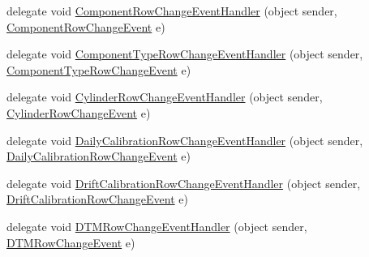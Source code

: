 \begin{DoxyCompactItemize}
\item 
delegate void \hyperlink{class_env_int_1_1_win32_1_1_field_tech_1_1_manager_1_1_data_sets_1_1_guide_ware_mobile_data_set_ab767e59a10801c8c87ea9efc7cbfbd8b}{Component\+Row\+Change\+Event\+Handler} (object sender, \hyperlink{class_env_int_1_1_win32_1_1_field_tech_1_1_manager_1_1_data_sets_1_1_guide_ware_mobile_data_set_1_1_component_row_change_event}{Component\+Row\+Change\+Event} e)
\item 
delegate void \hyperlink{class_env_int_1_1_win32_1_1_field_tech_1_1_manager_1_1_data_sets_1_1_guide_ware_mobile_data_set_abd1972df64c9aa03de1019f79a6c4631}{Component\+Type\+Row\+Change\+Event\+Handler} (object sender, \hyperlink{class_env_int_1_1_win32_1_1_field_tech_1_1_manager_1_1_data_sets_1_1_guide_ware_mobile_data_set_6cb4a1a3a59d09909759d45113e3e872}{Component\+Type\+Row\+Change\+Event} e)
\item 
delegate void \hyperlink{class_env_int_1_1_win32_1_1_field_tech_1_1_manager_1_1_data_sets_1_1_guide_ware_mobile_data_set_a8633b3d698f0ad882a4faeba4841f6ee}{Cylinder\+Row\+Change\+Event\+Handler} (object sender, \hyperlink{class_env_int_1_1_win32_1_1_field_tech_1_1_manager_1_1_data_sets_1_1_guide_ware_mobile_data_set_1_1_cylinder_row_change_event}{Cylinder\+Row\+Change\+Event} e)
\item 
delegate void \hyperlink{class_env_int_1_1_win32_1_1_field_tech_1_1_manager_1_1_data_sets_1_1_guide_ware_mobile_data_set_a6595251b6d65dffbbe61ca816dadb518}{Daily\+Calibration\+Row\+Change\+Event\+Handler} (object sender, \hyperlink{class_env_int_1_1_win32_1_1_field_tech_1_1_manager_1_1_data_sets_1_1_guide_ware_mobile_data_set_3eedff0336860edbfd90e1bca2652873}{Daily\+Calibration\+Row\+Change\+Event} e)
\item 
delegate void \hyperlink{class_env_int_1_1_win32_1_1_field_tech_1_1_manager_1_1_data_sets_1_1_guide_ware_mobile_data_set_a74711d801985d4a45cabf719e45510fc}{Drift\+Calibration\+Row\+Change\+Event\+Handler} (object sender, \hyperlink{class_env_int_1_1_win32_1_1_field_tech_1_1_manager_1_1_data_sets_1_1_guide_ware_mobile_data_set_aa92b3413cef1716fa2c99ea466ba9d7}{Drift\+Calibration\+Row\+Change\+Event} e)
\item 
delegate void \hyperlink{class_env_int_1_1_win32_1_1_field_tech_1_1_manager_1_1_data_sets_1_1_guide_ware_mobile_data_set_abe0bdf2a1603396d939e3b7d67751cd0}{D\+T\+M\+Row\+Change\+Event\+Handler} (object sender, \hyperlink{class_env_int_1_1_win32_1_1_field_tech_1_1_manager_1_1_data_sets_1_1_guide_ware_mobile_data_set_1_1_d_t_m_row_change_event}{D\+T\+M\+Row\+Change\+Event} e)

\end{DoxyCompactItemize}
